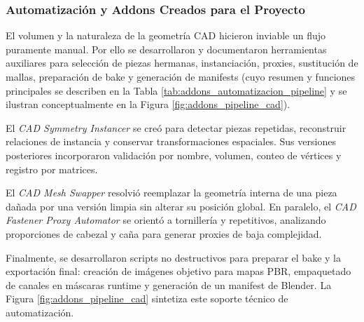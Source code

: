 \subsubsection{Automatización y Addons Creados para el Proyecto}

El volumen y la naturaleza de la geometría CAD hicieron inviable un flujo puramente manual. Por ello se desarrollaron y documentaron herramientas auxiliares para selección de piezas hermanas, instanciación, proxies, sustitución de mallas, preparación de bake y generación de manifests (cuyo resumen y funciones principales se describen en la Tabla \ref{tab:addons_automatizacion_pipeline} y se ilustran conceptualmente en la Figura \ref{fig:addons_pipeline_cad}).

El \textit{CAD Symmetry Instancer} se creó para detectar piezas repetidas, reconstruir relaciones de instancia y conservar transformaciones espaciales. Sus versiones posteriores incorporaron validación por nombre, volumen, conteo de vértices y registro por matrices.

El \textit{CAD Mesh Swapper} resolvió reemplazar la geometría interna de una pieza dañada por una versión limpia sin alterar su posición global. En paralelo, el \textit{CAD Fastener Proxy Automator} se orientó a tornillería y repetitivos, analizando proporciones de cabezal y caña para generar proxies de baja complejidad.

Finalmente, se desarrollaron scripts no destructivos para preparar el bake y la exportación final: creación de imágenes objetivo para mapas PBR, empaquetado de canales en máscaras runtime y generación de un manifest de Blender. La Figura \ref{fig:addons_pipeline_cad} sintetiza este soporte técnico de automatización.

